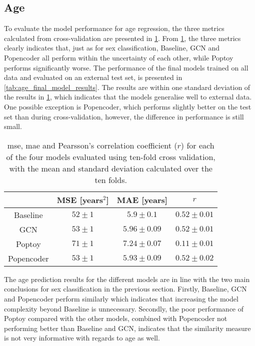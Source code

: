 \subsection{Age}
To evaluate the model performance for age regression, the three metrics calculated from cross-validation are presented in \cref{tab:age_model_results}. From \cref{tab:age_model_results}, the three metrics clearly indicates that, just as for sex classification, Baseline, GCN and Popencoder all perform within the uncertainty of each other, while Poptoy performs significantly worse. The performance of the final models trained on all data and evaluated on an external test set, is presented in \cref{tab:age_final_model_results}. The results are within one standard deviation of the results in \cref{tab:age_model_results}, which indicates that the models generalise well to external data. One possible exception is Popencoder, which performs slightly better on the test set than during cross-validation, however, the difference in performance is still small.

\begin{table}[!htbp]
    \centering
    \caption{\acrfull{mse}, \acrfull{mae} and Pearsson's correlation coefficient ($r$) for each of the four models evaluated using ten-fold cross validation, with the mean and standard deviation calculated over the ten folds.}
    \begin{tabular}{c|c|c|c}
         &  MSE [years$^2$]& MAE [years] & $r$ \\ \hline 
        Baseline &$52\pm1$& $5.9\pm0.1$&$0.52\pm0.01$\\
        GCN & $53\pm1$& $5.96\pm 0.09 $& $0.52\pm0.01$\\
        Poptoy &$71\pm 1$ & $7.24\pm0.07$ &$ 0.11\pm 0.01$\\
        Popencoder &$53\pm1$& $5.93\pm 0.09$ & $0.52\pm0.02$\\
    \end{tabular}
    \label{tab:age_model_results}
\end{table}

The age prediction results for the different models are in line with the two main conclusions for sex classification in the previous section. Firstly, Baseline, GCN and Popencoder perform similarly which indicates that increasing the model complexity beyond Baseline is unnecessary. Secondly, the poor performance of Poptoy compared with the other models, combined with Popencoder not performing better than Baseline and GCN, indicates that the similarity measure is not very informative with regards to age as well. 


